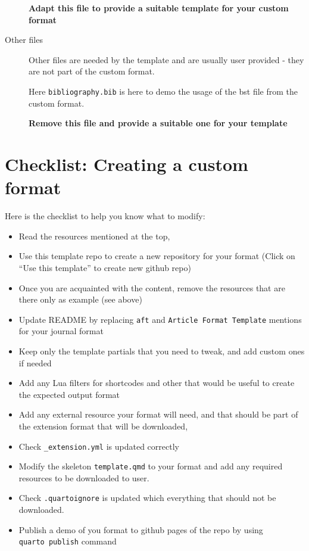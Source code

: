 \documentclass[
  10pt,
]{scrartcl}
\providecommand{\tightlist}{%
  \setlength{\itemsep}{0pt}\setlength{\parskip}{0pt}}\usepackage{longtable,booktabs,array}
\begin{document}
\begin{description}
\textbf{Adapt this file to provide a suitable template for your custom
format}
\item[Other files]
Other files are needed by the template and are usually user provided -
they are not part of the custom format.

Here \texttt{bibliography.bib} is here to demo the usage of the bst file
from the custom format.

\textbf{Remove this file and provide a suitable one for your template}
\end{description}

\newpage{}

\section{Checklist: Creating a custom
format}\label{checklist-creating-a-custom-format}

Here is the checklist to help you know what to modify:

\begin{itemize}
\tightlist
\item
  Read the resources mentioned at the top,
\item
  Use this template repo to create a new repository for your format
  (Click on ``Use this template'' to create new github repo)
\item
  Once you are acquainted with the content, remove the resources that
  are there only as example (see above)
\item
  Update README by replacing \texttt{aft} and
  \texttt{Article\ Format\ Template} mentions for your journal format
\item
  Keep only the template partials that you need to tweak, and add custom
  ones if needed
\item
  Add any Lua filters for shortcodes and other that would be useful to
  create the expected output format
\item
  Add any external resource your format will need, and that should be
  part of the extension format that will be downloaded,
\item
  Check \texttt{\_extension.yml} is updated correctly
\item
  Modify the skeleton \texttt{template.qmd} to your format and add any
  required resources to be downloaded to user.
\item
  Check \texttt{.quartoignore} is updated which everything that should
  not be downloaded.
\item
  Publish a demo of you format to github pages of the repo by using
  \texttt{quarto\ publish} command
\end{itemize}
\end{document}
